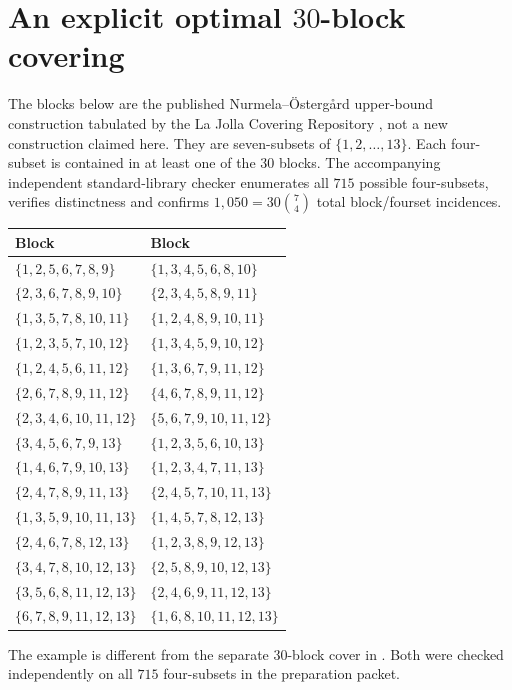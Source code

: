 \documentclass[11pt]{article}
\newcommand{\bin}[2]{\binom{#1}{#2}}
\theoremstyle{definition}
\theoremstyle{remark}
\begin{document}
\section[An explicit optimal 30-block covering]{An explicit optimal $30$-block covering}\label{app:cover}
The blocks below are the published Nurmela--\"Osterg\r{a}rd
upper-bound construction tabulated by the La Jolla Covering Repository
\cite{LJCR}, not a new construction claimed here. They are seven-subsets
of $\{1,2,\ldots,13\}$. Each four-subset is contained in at least one
of the $30$ blocks. The
accompanying independent standard-library checker enumerates all
$715$ possible four-subsets, verifies distinctness and confirms
$1{,}050=30\bin{7}{4}$ total block/fourset incidences.
\begin{center}
\begingroup\footnotesize\setlength{\tabcolsep}{6pt}
\begin{tabular}{@{}ll@{}}
\toprule
Block & Block\\
\midrule
$\{1,2,5,6,7,8,9\}$ & $\{1,3,4,5,6,8,10\}$\\
$\{2,3,6,7,8,9,10\}$ & $\{2,3,4,5,8,9,11\}$\\
$\{1,3,5,7,8,10,11\}$ & $\{1,2,4,8,9,10,11\}$\\
$\{1,2,3,5,7,10,12\}$ & $\{1,3,4,5,9,10,12\}$\\
$\{1,2,4,5,6,11,12\}$ & $\{1,3,6,7,9,11,12\}$\\
$\{2,6,7,8,9,11,12\}$ & $\{4,6,7,8,9,11,12\}$\\
$\{2,3,4,6,10,11,12\}$ & $\{5,6,7,9,10,11,12\}$\\
$\{3,4,5,6,7,9,13\}$ & $\{1,2,3,5,6,10,13\}$\\
$\{1,4,6,7,9,10,13\}$ & $\{1,2,3,4,7,11,13\}$\\
$\{2,4,7,8,9,11,13\}$ & $\{2,4,5,7,10,11,13\}$\\
$\{1,3,5,9,10,11,13\}$ & $\{1,4,5,7,8,12,13\}$\\
$\{2,4,6,7,8,12,13\}$ & $\{1,2,3,8,9,12,13\}$\\
$\{3,4,7,8,10,12,13\}$ & $\{2,5,8,9,10,12,13\}$\\
$\{3,5,6,8,11,12,13\}$ & $\{2,4,6,9,11,12,13\}$\\
$\{6,7,8,9,11,12,13\}$ & $\{1,6,8,10,11,12,13\}$\\
\bottomrule
\end{tabular}
\endgroup
\end{center}
The example is different from the separate $30$-block cover in
. Both were checked independently on all $715$
four-subsets in the preparation packet.
\end{document}

